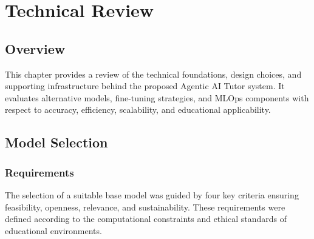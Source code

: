 \chapter{Technical Review}
\label{chap:technical_review}

\section{Overview}

This chapter provides a review of the technical foundations, design choices, and supporting infrastructure behind the proposed Agentic AI Tutor system. It evaluates alternative models, fine-tuning strategies, and MLOps components with respect to accuracy, efficiency, scalability, and educational applicability.

\section{Model Selection}

\subsection{Requirements}

The selection of a suitable base model was guided by four key criteria ensuring feasibility, openness, relevance, and sustainability. These requirements were defined according to the computational constraints and ethical standards of educational environments.

